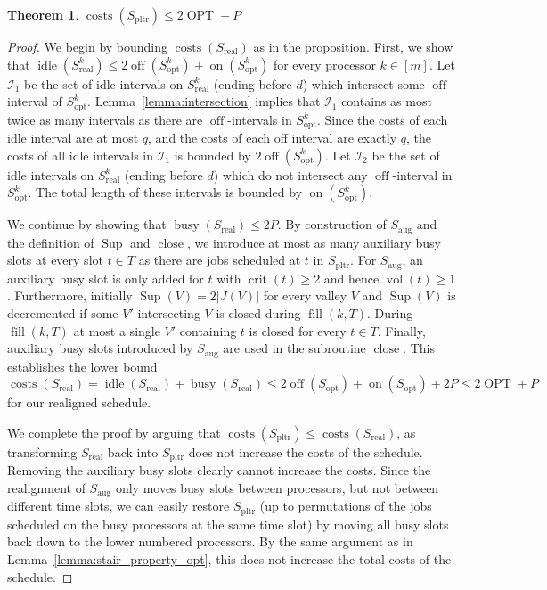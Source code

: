 \documentclass[a4paper]{article}
\DeclareMathOperator{\on}{on}
\DeclareMathOperator{\off}{off}
\DeclareMathOperator{\idle}{idle}
\DeclareMathOperator{\busy}{busy}
\DeclareMathOperator{\costs}{costs}
\DeclareMathOperator{\OPT}{OPT}
\DeclareMathOperator{\opt}{opt}
\DeclareMathOperator{\pltr}{pltr}
\DeclareMathOperator{\aug}{aug}
\DeclareMathOperator{\real}{real}
\DeclareMathOperator{\vol}{vol}
\DeclareMathOperator{\crit}{crit}
\DeclareMathOperator{\fillop}{fill}
\DeclareMathOperator{\close}{close}
\DeclareMathOperator{\res}{Sup}
\newtheorem{theorem}{Theorem}
\newtheorem{lemma}[theorem]{Lemma}
\begin{document}
\begin{theorem}\label{theorem:approximation}
  $\costs(S_{\pltr}) \leq 2 \OPT + P$
\end{theorem}
\begin{proof}
  We begin by bounding $\costs(S_{\real})$ as in the proposition.
  First, we show that $\idle(S^k_{\real}) \leq 2 \off(S^k_{\opt}) + \on(S^k_{\opt})$ for every processor $k \in [m]$.
  Let $\mathcal{I}_1$ be the set of idle intervals on $S^k_{\real}$ (ending before $d$) which intersect some $\off$-interval of $S^k_{\opt}$.
  Lemma~\ref{lemma:intersection} implies that $\mathcal{I}_1$ contains as most twice as many intervals as there are $\off$-intervals in $S^k_{\opt}$.
  Since the costs of each idle interval are at most $q$, and the costs of each off interval are exactly $q$, the costs of all idle intervals in $\mathcal{I}_1$ is bounded by $2 \off(S^k_{\opt})$.
  Let $\mathcal{I}_2$ be the set of idle intervals on $S^k_{\real}$ (ending before $d$) which do not intersect any $\off$-interval in $S^k_{\opt}$.
  The total length of these intervals is bounded by $\on(S^k_{\opt})$.

  We continue by showing that $\busy(S_{\real}) \leq 2 P$.
  By construction of $S_{\aug}$ and the definition of $\res$ and $\close$, we introduce at most as many auxiliary busy slots at every slot $t \in T$ as there are jobs scheduled at $t$ in $S_{\pltr}$.
  For $S_{\aug}$, an auxiliary busy slot is only added for $t$ with $\crit(t) \geq 2$ and hence $\vol(t) \geq 1$.
  Furthermore, initially $\res(V) = 2 |J(V)|$ for every valley $V$ and $\res(V)$ is decremented if some $V'$ intersecting $V$ is closed during $\fillop(k, T)$.
  During $\fillop(k, T)$ at most a single $V'$ containing $t$ is closed for every $t \in T$.
  Finally, auxiliary busy slots introduced by $S_{\aug}$ are used in the subroutine $\close$.
  This establishes the lower bound $\costs(S_{\real}) = \idle(S_{\real}) + \busy(S_{\real}) \leq 2 \off(S_{\opt}) + \on(S_{\opt}) + 2 P \leq 2 \OPT + P$ for our realigned schedule.

  We complete the proof by arguing that $\costs(S_{\pltr}) \leq \costs(S_{\real})$, as transforming $S_{\real}$ back into $S_{\pltr}$ does not increase the costs of the schedule.
  Removing the auxiliary busy slots clearly cannot increase the costs.
  Since the realignment of $S_{\aug}$ only moves busy slots between processors, but not between different time slots, we can easily restore $S_{\pltr}$ (up to permutations of the jobs scheduled on the busy processors at the same time slot) by moving all busy slots back down to the lower numbered processors.
  By the same argument as in Lemma~\ref{lemma:stair_property_opt}, this does not increase the total costs of the schedule.
\end{proof}
\end{document}
